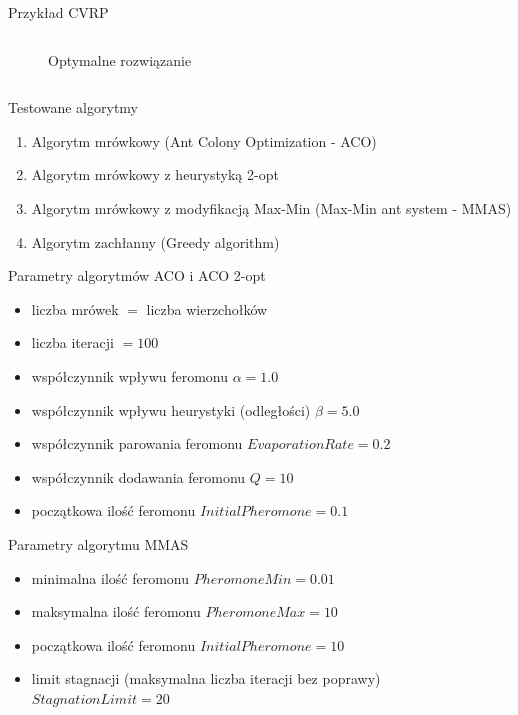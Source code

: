 \documentclass{beamer}
\begin{document}
\begin{frame}{Przykład CVRP}
\begin{columns}
\begin{column}{0.55\textwidth}
\begin{figure}
                \caption{Optymalne rozwiązanie}
            \end{figure}        
        \end{column}
    \end{columns}
\end{frame}

\begin{frame}{Testowane algorytmy}
  \begin{enumerate}
    \setlength\itemsep{1em}
    \item Algorytm mrówkowy (Ant Colony Optimization - ACO) \cite{dorigo}
    \item Algorytm mrówkowy z heurystyką 2-opt \cite{tan}
    \item Algorytm mrówkowy z modyfikacją Max-Min (Max-Min ant system - MMAS) \cite{maxmin}
    \item Algorytm zachłanny (Greedy algorithm)
  \end{enumerate}
\end{frame}

\begin{frame}{Parametry algorytmów ACO i ACO 2-opt}
    \begin{itemize}
        \setlength\itemsep{1em}
        \item liczba mrówek $=$ liczba wierzchołków
        \item liczba iteracji $= 100$
        \item współczynnik wpływu feromonu $\alpha = 1.0$
        \item współczynnik wpływu heurystyki (odległości) $\beta = 5.0$ 
        \item współczynnik parowania feromonu $EvaporationRate = 0.2$
        \item współczynnik dodawania feromonu $Q = 10$
        \item początkowa ilość feromonu $InitialPheromone = 0.1$
    \end{itemize}
\end{frame}

\begin{frame}{Parametry algorytmu MMAS}
    \begin{itemize}
        \setlength\itemsep{1em}
        \item minimalna ilość feromonu $PheromoneMin = 0.01$
        \item maksymalna ilość feromonu $PheromoneMax = 10$
        \item początkowa ilość feromonu $InitialPheromone = 10$ 
        \item limit stagnacji (maksymalna liczba iteracji bez poprawy) $StagnationLimit = 20$
    \end{itemize}
\end{frame}
\end{document}
